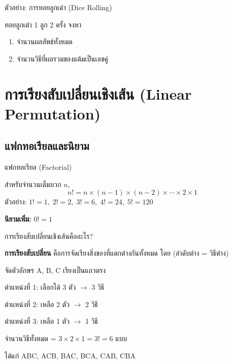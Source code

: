\documentclass[11pt, aspectratio=169]{beamer}
\begin{document}
\begin{frame}[t]{ตัวอย่าง: การทอยลูกเต๋า (Dice Rolling)}
  \begin{exambox}[โจทย์]
    ทอยลูกเต๋า 1 ลูก 2 ครั้ง จงหา
    \begin{enumerate}
      \item[(ก)] จำนวนผลลัพธ์ทั้งหมด
      \item[(ข)] จำนวนวิธีที่ผลรวมของแต้มเป็นเลขคู่
    \end{enumerate}
  \end{exambox}

  \vspace{\fill}
\end{frame}

\section{การเรียงสับเปลี่ยนเชิงเส้น (Linear Permutation)}

\subsection{แฟกทอเรียลและนิยาม}

\begin{frame}{แฟกทอเรียล (Factorial)}
  \begin{explanation}
    สำหรับจำนวนเต็มบวก $n$,
    \[
      n! = n \times (n-1) \times (n-2) \times \cdots \times 2 \times 1
    \]
    ตัวอย่าง: $1! = 1, \;  2! = 2, \;  3! = 6, \;  4! = 24, \;  5! = 120$

    \medskip
    \textbf{นิยามเพิ่ม:} $0! = 1$
  \end{explanation}
\end{frame}

\begin{frame}{การเรียงสับเปลี่ยนเชิงเส้นคืออะไร?}
  \begin{explanation}
    \textbf{การเรียงสับเปลี่ยน} คือการจัดเรียงสิ่งของที่แตกต่างกันทั้งหมด
    โดย  (ลำดับต่าง = วิธีต่าง)
  \end{explanation}

  \begin{exambox}[ตัวอย่าง]
    จัดตัวอักษร A, B, C เรียงเป็นแถวตรง

    \medskip
    ตำแหน่งที่ 1: เลือกได้ 3 ตัว \quad $\rightarrow$ 3 วิธี

    ตำแหน่งที่ 2: เหลือ 2 ตัว \quad $\rightarrow$ 2 วิธี

    ตำแหน่งที่ 3: เหลือ 1 ตัว \quad $\rightarrow$ 1 วิธี

    \medskip
    จำนวนวิธีทั้งหมด = $3 \times 2 \times 1 = 3! = 6$ แบบ

    \medskip
    ได้แก่ ABC, ACB, BAC, BCA, CAB, CBA
  \end{exambox}
\end{frame}
\end{document}
